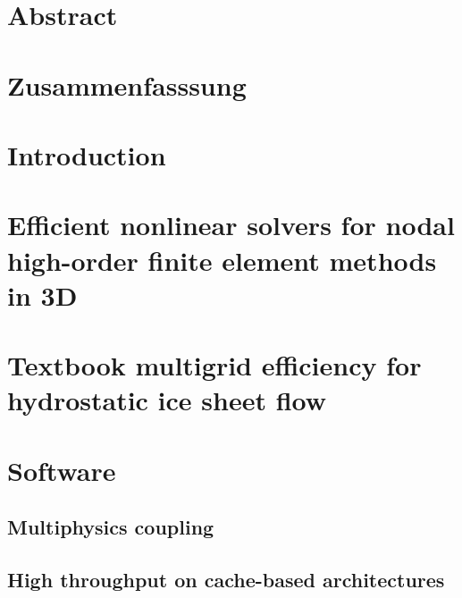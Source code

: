 \documentclass[a4paper,twoside,11pt,pdftex]{report}
\begin{document}
\pagestyle{plain}


\cleardoublepage

\tableofcontents
\listoffigures
\listoftables

\chapter*{Abstract}
\thispagestyle{contents}
\label{sec:abstract}


\chapter*{Zusammenfasssung}
\thispagestyle{contents}
%
\cleardoublepage

\setcounter{page}{1}
\pagestyle{body}

\chapter{Introduction}\label{sec:introduction}


\chapter{Efficient nonlinear solvers for nodal high-order finite element methods in 3D}\label{chap:dohp}

\cleardoublepage

\chapter{Textbook multigrid efficiency for hydrostatic ice sheet flow}\label{chap:tme-ice}


\cleardoublepage
\chapter{Software}\label{chap:software}

\section{Multiphysics coupling}\label{sec:multiphysics}


\section{High throughput on cache-based architectures}\label{sec:throughput}

\end{document}
